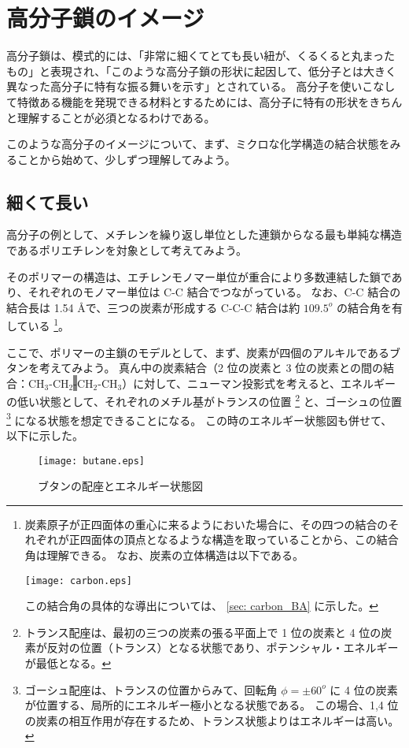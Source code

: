 \documentclass[a4paper,11pt]{ltjsarticle}
\begin{document}
\newpage

\section{高分子鎖のイメージ}

高分子鎖は、模式的には、「非常に細くてとても長い紐が、くるくると丸まったもの」と表現され、「このような高分子鎖の形状に起因して、低分子とは大きく異なった高分子に特有な振る舞いを示す」とされている。
高分子を使いこなして特徴ある機能を発現できる材料とするためには、高分子に特有の形状をきちんと理解することが必須となるわけである。

このような高分子のイメージについて、まず、ミクロな化学構造の結合状態をみることから始めて、少しずつ理解してみよう。

\subsection{細くて長い}

高分子の例として、メチレンを繰り返し単位とした連鎖からなる最も単純な構造であるポリエチレンを対象として考えてみよう。

そのポリマーの構造は、エチレンモノマー単位が重合により多数連結した鎖であり、それぞれのモノマー単位は C-C 結合でつながっている。
なお、C-C 結合の結合長は 1.54 \AA で、三つの炭素が形成する C-C-C 結合は約 $109.5^o$ の結合角を有している
\footnote
{
炭素原子が正四面体の重心に来るようにおいた場合に、その四つの結合のそれぞれが正四面体の頂点となるような構造を取っていることから、この結合角は理解できる。
なお、炭素の立体構造は以下である。
\begin{center}
	\texttt{[image: carbon.eps]}
\end{center}

この結合角の具体的な導出については、 \ref{sec: carbon_BA} に示した。
}。

ここで、ポリマーの主鎖のモデルとして、まず、炭素が四個のアルキルであるブタンを考えてみよう。
真ん中の炭素結合（2 位の炭素と 3 位の炭素との間の結合：CH$_3$-CH$_2$\colorbox{gray}{-}CH$_2$-CH$_3$）に対して、ニューマン投影式を考えると、エネルギーの低い状態として、それぞれのメチル基がトランスの位置
\footnote
{
トランス配座は、最初の三つの炭素の張る平面上で 1 位の炭素と 4 位の炭素が反対の位置（トランス）となる状態であり、ポテンシャル・エネルギーが最低となる。
}
と、ゴーシュの位置
\footnote
{
ゴーシュ配座は、トランスの位置からみて、回転角 $\phi = \pm 60^o$ に 4 位の炭素が位置する、局所的にエネルギー極小となる状態である。
この場合、1,4 位の炭素の相互作用が存在するため、トランス状態よりはエネルギーは高い。
}
になる状態を想定できることになる。
この時のエネルギー状態図も併せて、以下に示した。
\begin{figure}[htb]
 \centering
	\texttt{[image: butane.eps]}
	\caption{ブタンの配座とエネルギー状態図}
	\label{fig: butane}
\end{figure}
\end{document}
